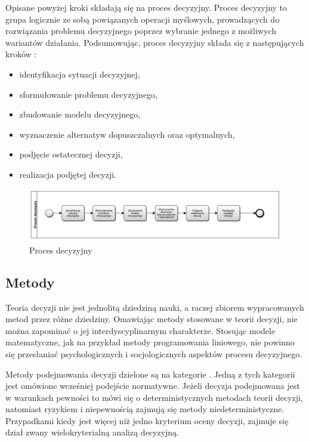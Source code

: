 Opisane powyżej kroki składają się na proces decyzyjny. Proces decyzyjny to 
grupa logicznie ze sobą powiązanych operacji myślowych, prowadzących do 
rozwiązania problemu decyzyjnego poprzez wybranie jednego z możliwych wariantów 
działania. Podsumowując, proces decyzyjny składa się z następujących kroków
\cite{Baker2002,Fulop2005}:
\begin{itemize}

\item identyfikacja sytuacji decyzyjnej,

\item sformułowanie problemu decyzyjnego,

\item zbudowanie modelu decyzyjnego,

\item wyznaczenie alternatyw dopuszczalnych oraz optymalnych,

\item podjęcie ostatecznej decyzji,

\item realizacja podjętej decyzji.

\end{itemize}
\begin{figure}[ht]
  \includegraphics[width=\linewidth]
  {chapters/decisiontheory/proces_decyzyjny}
  \caption{Proces decyzyjny}
  \label{fig:proces_decyzyjny}
\end{figure}

\subsection{Metody}
Teoria decyzji nie jest jednolitą dziedziną nauki, a raczej zbiorem 
wypracowanych metod przez różne dziedziny. Omawiając metody stosowane w teorii 
decyzji, nie można zapominać o jej interdyscyplinarnym charakterze. Stosując 
modele matematyczne, jak na przykład metody programowania liniowego, nie 
powinno się przesłaniać psychologicznych i socjologicznych aspektów procesu 
decyzyjnego.

Metody podejmowania decyzji dzielone są na kategorie \cite{Fulop2005}. Jedną z
tych kategorii jest omówione wcześniej podejście normatywne. Jeżeli decyzja
podejmowana jest w warunkach pewności to mówi się o deterministycznych metodach
teorii decyzji, natomiast ryzykiem i niepewnością zajmują się metody
niedeterministyczne. Przypadkami kiedy jest więcej niż jedno kryterium oceny
decyzji, zajmuje się dział zwany wielokryterialną analizą decyzyjną.

